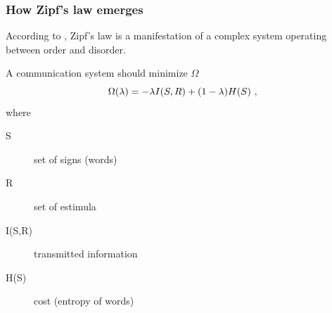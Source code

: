 \documentclass{beamer}
\begin{document}
\frame
{
  \frametitle{How Zipf's law emerges}
  According to \cite{ramon2003,ferrer05}, Zipf's law is a manifestation
  of a complex system operating between order and disorder.

  \vspace{0.5cm}
  A communication system should minimize $\Omega$ 
  \begin{equation}
  \Omega(\lambda) = - \lambda I(S,R) + (1-\lambda) H(S) \textmd{ ,}
  \end{equation}
  where
  \begin{description}
  \item[S] set of signs (words)
  \item[R] set of estimula 
  \item[I(S,R)] transmitted information 
  \item[H(S)] cost (entropy of words) 
  \end{description}
}
\end{document}
